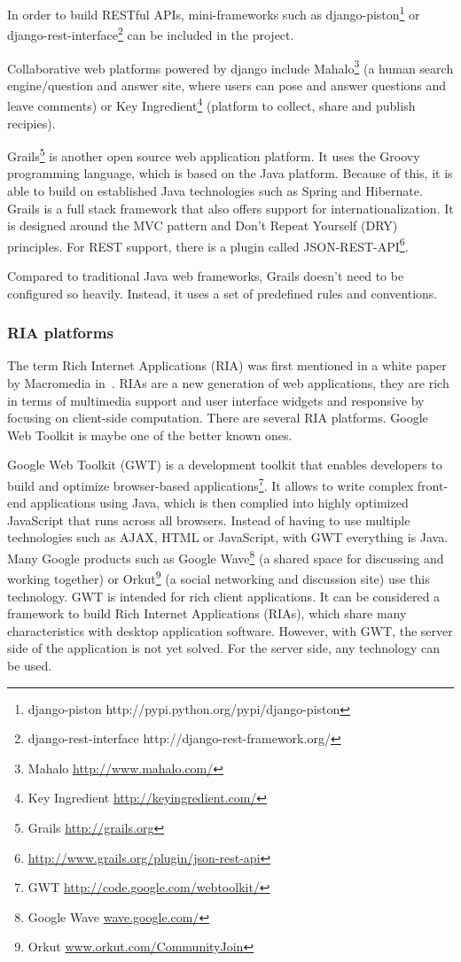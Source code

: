 In order to build RESTful APIs, mini-frameworks such as django-piston\footnote{django-piston http://pypi.python.org/pypi/django-piston} or django-rest-interface\footnote{django-rest-interface http://django-rest-framework.org/} can be included in the project. 

Collaborative web platforms powered by django include Mahalo\footnote{Mahalo \url{http://www.mahalo.com/}} (a human search engine/question and answer site, where users can pose and answer questions and leave comments) or Key Ingredient\footnote{Key Ingredient \url{http://keyingredient.com/}} (platform to collect, share and publish recipies).   

Grails\footnote{Grails \url{http://grails.org}} is another open source web application platform. It uses the Groovy programming language, which is based on the Java platform. Because of this, it is able to build on established Java technologies such as Spring and Hibernate. Grails is a full stack framework that also offers support for internationalization. It is designed around the MVC pattern and Don't Repeat Yourself (DRY) principles.
For REST support, there is a plugin called JSON-REST-API\footnote{\url{http://www.grails.org/plugin/json-rest-api}}.

Compared to traditional Java web frameworks, Grails doesn't need to be configured so heavily. Instead, it uses a set of predefined rules and conventions.


\subsubsection{RIA platforms}
The term Rich Internet Applications (RIA) was first mentioned in a white paper by Macromedia in~\cite{ria}. RIAs are a new generation of web applications, they are rich in terms of multimedia support and user interface widgets and responsive by focusing on client-side computation.
There are several RIA platforms. Google Web Toolkit is maybe one of the better known ones. 
 
Google Web Toolkit (GWT) is a development toolkit that enables developers to build and optimize browser-based applications\footnote{GWT \url{http://code.google.com/webtoolkit/}}.  It allows to write complex front-end applications using Java, which is then complied into highly optimized JavaScript that runs across all browsers. Instead of having to use multiple technologies such as AJAX, HTML or JavaScript, with GWT everything is Java. Many Google products such as Google Wave\footnote{Google Wave \url{wave.google.com/}} (a shared space for discussing and working together) or Orkut\footnote{Orkut \url{www.orkut.com/CommunityJoin}} (a social networking and discussion site) use this technology. GWT is intended for rich client applications. It can be considered a framework to build Rich Internet Applications (RIAs), which share many characteristics with desktop application software. 
However, with GWT, the server side of the application is not yet solved. For the server side, any technology can be used. 

